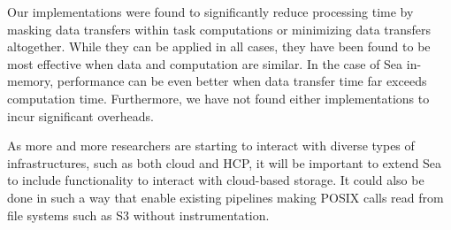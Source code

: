 Our implementations were found to significantly reduce processing time by
masking data transfers within task computations or minimizing data transfers
altogether. While they can be applied in all cases, they have been found to be
most effective when data and computation are similar. In the case of Sea
in-memory, performance can be even better when data transfer time far exceeds
computation time. Furthermore, we have not found either implementations to incur
significant overheads.

As more and more researchers are starting to interact with diverse types of
infrastructures, such as both cloud and HCP, it will be important to extend Sea
to include functionality to interact with cloud-based storage. It could also be
done in such a way that enable existing pipelines making POSIX calls read from
file systems such as S3 without instrumentation.



